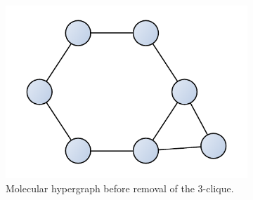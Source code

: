 \documentclass{article}
\begin{document}
\begin{figure}
    \centering
    \begin{subfigure}[b]{0.48\textwidth}
        \centering
        \includegraphics[scale=0.2]{images/mols_clique_connected.pdf}
        \caption{Molecular hypergraph before removal of the 3-clique.}
    \end{subfigure}
    \hfill
    \begin{subfigure}[b]{0.48\textwidth}
        \centering

\end{subfigure}
\end{figure}
\end{document}
